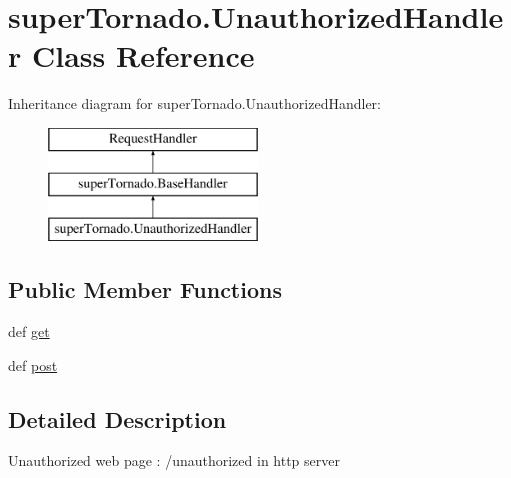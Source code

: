 \hypertarget{classsuper_tornado_1_1_unauthorized_handler}{\section{super\-Tornado.\-Unauthorized\-Handler Class Reference}
\label{classsuper_tornado_1_1_unauthorized_handler}
}
Inheritance diagram for super\-Tornado.\-Unauthorized\-Handler\-:\begin{figure}[H]
\begin{center}
\leavevmode
\includegraphics[height=3.000000cm]{classsuper_tornado_1_1_unauthorized_handler}
\end{center}
\end{figure}
\subsection*{Public Member Functions}
\begin{DoxyCompactItemize}
\item 
def \hyperlink{classsuper_tornado_1_1_unauthorized_handler_abd4e0e51dd5bae66506808c6e2beeb8d}{get}
\item 
def \hyperlink{classsuper_tornado_1_1_unauthorized_handler_af4b77e66e008a11b82cad37160e4c5d9}{post}
\end{DoxyCompactItemize}


\subsection{Detailed Description}
\begin{DoxyVerb}Unauthorized web page : /unauthorized in http server
\end{DoxyVerb}
 

